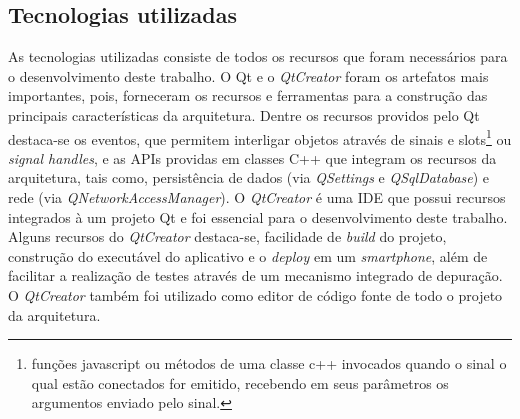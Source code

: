 \subsection{Tecnologias utilizadas}
As tecnologias utilizadas consiste de todos os recursos que foram necessários para o desenvolvimento deste trabalho. O Qt e o \textit{QtCreator} foram os artefatos mais importantes, pois, forneceram os recursos e ferramentas para a construção das principais características da arquitetura. Dentre os recursos providos pelo Qt destaca-se os eventos, que permitem interligar objetos através de sinais e slots\footnote{funções javascript ou métodos de uma classe c++ invocados quando o sinal o qual estão conectados for emitido, recebendo em seus parâmetros os argumentos enviado pelo sinal.} ou \textit{signal handles}, e as APIs providas em classes C++ que integram os recursos da arquitetura, tais como, persistência de dados (via \textit{QSettings} e \textit{QSqlDatabase}) e rede (via \textit{QNetworkAccessManager}). O \textit{QtCreator} é uma IDE que possui recursos integrados à um projeto Qt e foi essencial para o desenvolvimento deste trabalho. Alguns recursos do \textit{QtCreator} destaca-se, facilidade de \textit{build} do projeto, construção do executável do aplicativo e o \textit{deploy} em um \textit{smartphone}, além de facilitar a realização de testes através de um mecanismo integrado de depuração. O \textit{QtCreator} também foi utilizado como editor de código fonte de todo o projeto da arquitetura.



